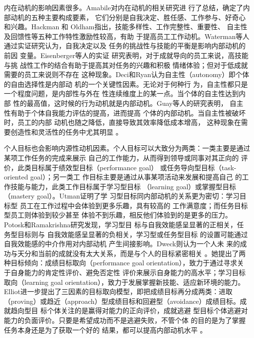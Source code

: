 内在动机的影响因素很多。Amabile对内在动机的相关研究进
行了总结，确定了内部动机的五种主要构成要素，
它们分别是自我决定、胜任感、工作参与、好奇心
和兴趣\cite{amabile1996cc}。Hackman 和
Oldham指出，技能多样性、工作完整性、重要性、
自主性及回馈性等五种工作特性激励性较高，有助
于提高员工工作动机\cite{hackman1975djd}。Waterman等人通过实证研究认为，自我决定以及
任务的挑战性与技能的平衡是影响内部动机的前因
变量\cite{AlanSWaterman11012003}。Eisenberger等人的实证
研究表明，对于成就导向的员工来说，高技能与挑
战性工作的结合有助于提高其对任务的兴趣和积极
情绪体验；但对于低成就需要的员工来说则不存在
这种现象\cite{Eisenberger2005}。Deci和Ryan认为自主性（autonomy）即个体的自由选择性是内部动
机的一个关键性因素。无论对于何种行
为，自主性都只是一个程度问题，是内部性与外在
性连续维度上的某一点。当个体的自主性达到内部
性的最高值，这时候的行为动机就是内部动机\cite{ryan2000sdt}。Guay等人的研究表明，
自主性有助于个体自我能力评估的提高，进而提高
个体的内部动机。当自主性被破坏时，员工的内部
动机也随之降低，直接导致其效率降低成本增高，
这种现象在需要创造性和灵活性的任务中尤其明显
\cite{FredericGuay06012001}。



个人目标也会影响内源性动机因素。个人目标可以大致分为两类：一类主要是通过某项工作任务的完成来展示
自己的工作能力，从而得到领导或同事对其正向的
评价，此类目标属于绩效型目标（performance goal）
或任务导向型目标（task-oriented goal）；另一类工
作目标主要是通过从事某项活动来发展和提高自己
的工作技能与能力，此类工作目标属于学习型目标
（learning goal）或掌握型目标（mastery
goal）\cite{LairdJRawsthorne11011999,Pajares2000}。Utman证明了学
习型目标同内部动机的关系更为密切：学习目标型
员工在工作过程中会体验到更多乐趣，具有较高的
工作满意度；而任务目标型员工则体验到较少甚至
体验不到乐趣，相反他们体验到的是更多的压力\cite{ChristopherHUtman05011997}。Potosk和Ramakrishna研究发现，学习型目
标与自我效能感呈显著的正相关，任务型目标则与
自我效能感呈显著的负相关，学习型或任务型目标
的设置可能通过自我效能感的中介作用对内部动机
产生间接影响\cite{potosky2002mru}。Dweck则认为一个人未
来的成功与天分和当前的成就没有太大关系，而是与个人的目标紧密相关
\cite{dweck2000stt}。她提出了两种目标倾向：成绩目标取向（performance
goal orientation），致力于通过寻求关于自身能力的肯定性评价、避免否定性
评价来展示自身能力的高水平；学习目标取向（learning goal
orientation），致力于发展掌握新技能、适应新环境的能力。Elliot进一步提出了三因素的目标取向模型，即把成绩目标再分成两类：进取（proving）或趋近（approach）型成绩目标和回避型（avoidance）成绩目标\cite{elliot1996aaa}。成就趋向型目
标个体关注的是赢得对能力的正向评价，成就逃避
型目标个体逃避对能力的负面评价。只要是希望成功而不是逃避失败，不管个体
的目的是为了掌握任务本身还是为了获取一个好的
结果，都可以提高内部动机水平 。




